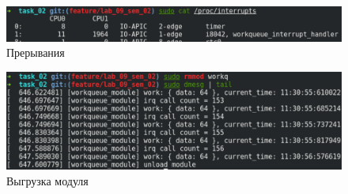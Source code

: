 \begin{figure}[H]
    \centering
    \includegraphics[scale=0.7]{img/part_02/interrupt.png}
    \caption{Прерывания}
\end{figure}

\begin{figure}[H]
    \centering
    \includegraphics[scale=0.7]{img/part_02/rmmod.png}
    \caption{Выгрузка модуля}
\end{figure}
